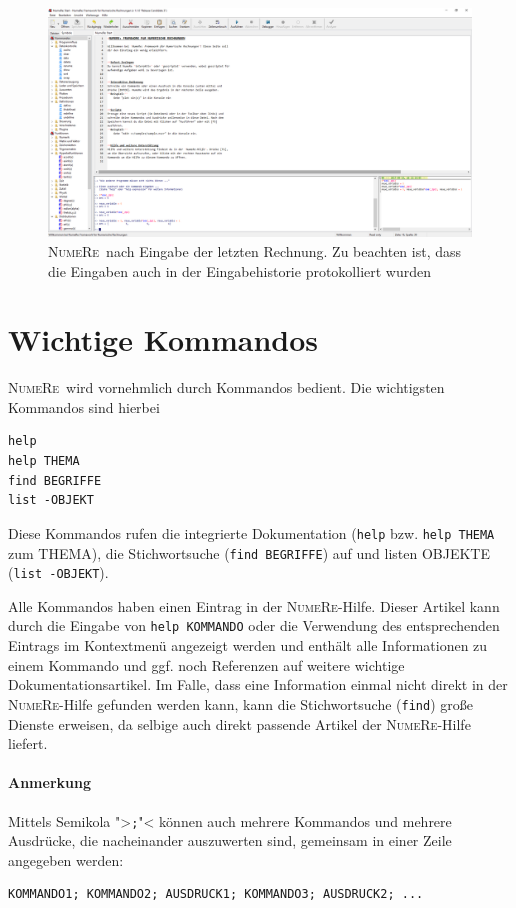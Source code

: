 \documentclass[DIV=14,headsepline,footsepline]{scrbook}
\newcommand{\NR}{\textsc{Nu\-me\-Re}}
\begin{document}
				\begin{figure}[htb]%
					\centering
					\includegraphics[width=\textwidth]{_graphics/first_calc_1.png}
					\caption{\NR\ nach Eingabe der letzten Rechnung. Zu beachten ist, dass die Eingaben auch in der Eingabehistorie protokolliert wurden}
					\label{fig:first_calc_1}
				\end{figure}
			\section{Wichtige Kommandos}
				\NR\ wird vornehmlich durch Kommandos bedient. Die wichtigsten Kommandos sind hierbei
					\begin{lstlisting}
help
help THEMA
find BEGRIFFE
list -OBJEKT
					\end{lstlisting}
					Diese Kommandos rufen die integrierte Dokumentation (\verb+help+ bzw. \verb+help THEMA+ zum THEMA), die Stichwortsuche (\verb+find BEGRIFFE+) auf und listen OBJEKTE (\verb+list -OBJEKT+).
					
					Alle Kommandos haben einen Eintrag in der \NR-Hilfe. Dieser Artikel kann durch die Eingabe von \verb+help KOMMANDO+ oder die Verwendung des entsprechenden Eintrags im Kontextmenü angezeigt werden und enthält alle Informationen zu einem Kommando und ggf. noch Referenzen auf weitere wichtige Dokumentationsartikel. Im Falle, dass eine Information einmal nicht direkt in der \NR-Hilfe gefunden werden kann, kann die Stichwortsuche (\verb+find+) große Dienste erweisen, da selbige auch direkt passende Artikel der \NR-Hilfe liefert.
					\paragraph{Anmerkung}
						Mittels Semikola ">\verb+;+"< können auch mehrere Kommandos und mehrere Ausdrücke, die nacheinander auszuwerten sind, gemeinsam in einer Zeile angegeben werden:
						\begin{lstlisting}
KOMMANDO1; KOMMANDO2; AUSDRUCK1; KOMMANDO3; AUSDRUCK2; ...
						\end{lstlisting}
\end{document}
